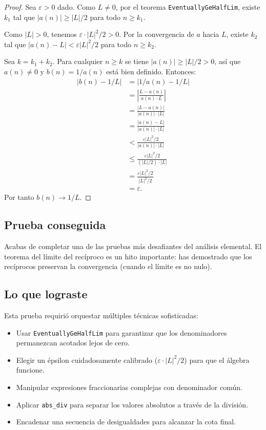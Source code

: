 \begin{proof}
Sea $\varepsilon > 0$ dado. Como $L \neq 0$, por el teorema
\texttt{EventuallyGeHalfLim}, existe $k_1$ tal que $|a(n)| \geq |L|/2$ para
todo $n \geq k_1$.

Como $|L| > 0$, tenemos $\varepsilon \cdot |L|^2/2 > 0$. Por la convergencia
de $a$ hacia $L$, existe $k_2$ tal que $|a(n) - L| < \varepsilon |L|^2/2$
para todo $n \geq k_2$.

Sea $k = k_1 + k_2$. Para cualquier $n \geq k$ se tiene $|a(n)| \geq |L|/2
> 0$, así que $a(n) \neq 0$ y $b(n) = 1/a(n)$ está bien definido. Entonces:
\begin{align*}
  |b(n) - 1/L| &= |1/a(n) - 1/L|                          \\
               &= \left|\frac{L - a(n)}{a(n) \cdot L}\right|  \\
               &= \frac{|L - a(n)|}{|a(n)| \cdot |L|}         \\
               &= \frac{|a(n) - L|}{|a(n)| \cdot |L|}         \\
               &< \frac{\varepsilon |L|^2/2}{|a(n)| \cdot |L|}          \\
               &\leq \frac{\varepsilon |L|^2/2}{(|L|/2) \cdot |L|}         \\
               &= \frac{\varepsilon |L|^2/2}{|L|^2/2}               \\
               &= \varepsilon.
\end{align*}
Por tanto $b(n) \to 1/L$.
\end{proof}

\subsection{Prueba conseguida}

Acabas de completar una de las pruebas más desafiantes del análisis
elemental. El teorema del límite del recíproco es un hito importante: has
demostrado que los recíprocos preservan la convergencia (cuando el límite es
no nulo).

\subsection{Lo que lograste}

Esta prueba requirió orquestar múltiples técnicas sofisticadas:

\begin{itemize}
  \item Usar \texttt{EventuallyGeHalfLim} para garantizar que los
    denominadores permanezcan acotados lejos de cero.
  \item Elegir un épsilon cuidadosamente calibrado ($\varepsilon \cdot
    |L|^2/2$) para que el álgebra funcione.
  \item Manipular expresiones fraccionarias complejas con denominador común.
  \item Aplicar \texttt{abs\_div} para separar los valores absolutos a
    través de la división.
  \item Encadenar una secuencia de desigualdades para alcanzar la cota
    final.
\end{itemize}

